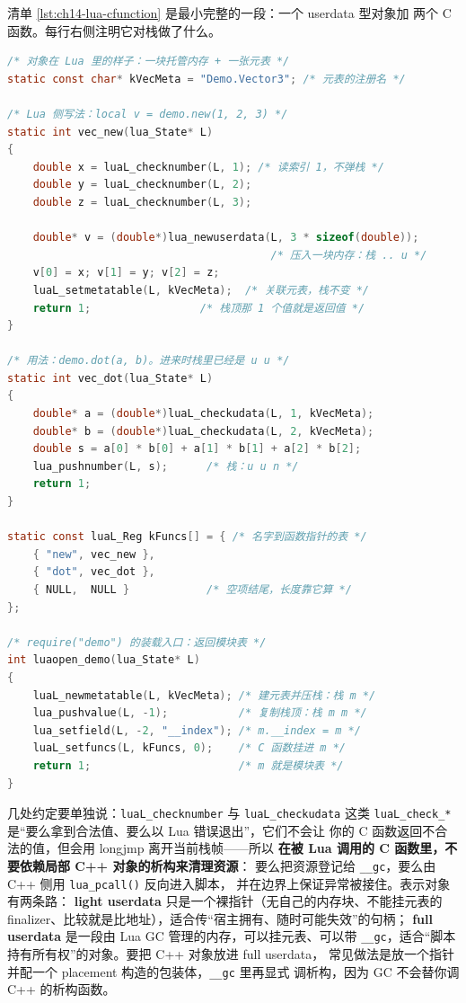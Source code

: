 \documentclass[12pt,a4paper,fontset=fandol]{ctexbook}
\newcommand{\Fn}[1]{\texttt{#1()}}
\newcommand{\Tp}[1]{\texttt{#1}}
\newcommand{\Lib}[1]{\textbf{\texttt{#1}}}
\begin{document}
清单 \ref{lst:ch14-lua-cfunction} 是最小完整的一段：一个 userdata 型对象加
两个 C 函数。每行右侧注明它对栈做了什么。

\begin{lstlisting}[language=C, style=cstyle, caption={\Lib{Lua} C 函数：压栈、检查、返回值的完整契约}, label={lst:ch14-lua-cfunction}]
/* 对象在 Lua 里的样子：一块托管内存 + 一张元表 */
static const char* kVecMeta = "Demo.Vector3"; /* 元表的注册名 */

/* Lua 侧写法：local v = demo.new(1, 2, 3) */
static int vec_new(lua_State* L)
{
    double x = luaL_checknumber(L, 1); /* 读索引 1，不弹栈 */
    double y = luaL_checknumber(L, 2);
    double z = luaL_checknumber(L, 3);

    double* v = (double*)lua_newuserdata(L, 3 * sizeof(double));
                                         /* 压入一块内存：栈 .. u */
    v[0] = x; v[1] = y; v[2] = z;
    luaL_setmetatable(L, kVecMeta);  /* 关联元表，栈不变 */
    return 1;                 /* 栈顶那 1 个值就是返回值 */
}

/* 用法：demo.dot(a, b)。进来时栈里已经是 u u */
static int vec_dot(lua_State* L)
{
    double* a = (double*)luaL_checkudata(L, 1, kVecMeta);
    double* b = (double*)luaL_checkudata(L, 2, kVecMeta);
    double s = a[0] * b[0] + a[1] * b[1] + a[2] * b[2];
    lua_pushnumber(L, s);      /* 栈：u u n */
    return 1;
}

static const luaL_Reg kFuncs[] = { /* 名字到函数指针的表 */
    { "new", vec_new },
    { "dot", vec_dot },
    { NULL,  NULL }            /* 空项结尾，长度靠它算 */
};

/* require("demo") 的装载入口：返回模块表 */
int luaopen_demo(lua_State* L)
{
    luaL_newmetatable(L, kVecMeta); /* 建元表并压栈：栈 m */
    lua_pushvalue(L, -1);           /* 复制栈顶：栈 m m */
    lua_setfield(L, -2, "__index"); /* m.__index = m */
    luaL_setfuncs(L, kFuncs, 0);    /* C 函数挂进 m */
    return 1;                       /* m 就是模块表 */
}
\end{lstlisting}

几处约定要单独说：\Tp{luaL\_checknumber} 与 \Tp{luaL\_checkudata} 这类
\Tp{luaL\_check\_*} 是``要么拿到合法值、要么以 Lua 错误退出''，它们不会让
你的 C 函数返回不合法的值，但会用 longjmp 离开当前栈帧——所以
\textbf{在被 Lua 调用的 C 函数里，不要依赖局部 C++ 对象的析构来清理资源}：
要么把资源登记给 \Tp{\_\_gc}，要么由 C++ 侧用 \Fn{lua\_pcall} 反向进入脚本，
并在边界上保证异常被接住。表示对象有两条路：
\textbf{light userdata} 只是一个裸指针（无自己的内存块、不能挂元表的
finalizer、比较就是比地址），适合传``宿主拥有、随时可能失效''的句柄；
\textbf{full userdata} 是一段由 Lua GC 管理的内存，可以挂元表、可以带
\Tp{\_\_gc}，适合``脚本持有所有权''的对象。要把 C++ 对象放进 full userdata，
常见做法是放一个指针并配一个 placement 构造的包装体，\Tp{\_\_gc} 里再显式
调析构，因为 GC 不会替你调 C++ 的析构函数。
\end{document}
